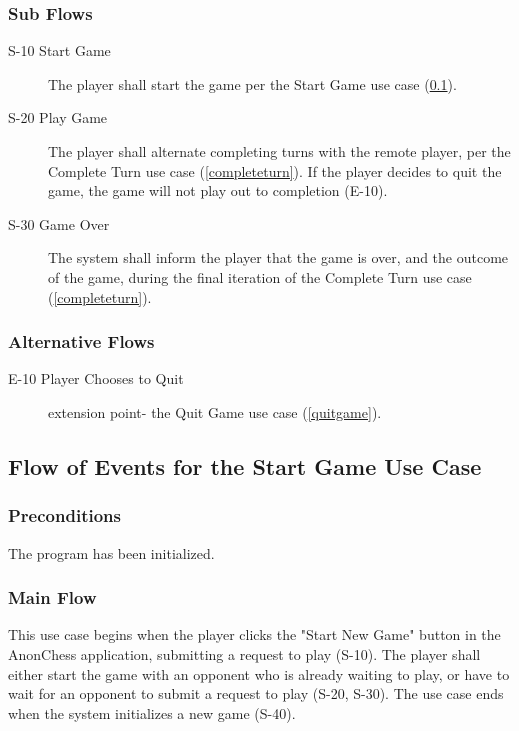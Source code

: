 \subsubsection{Sub Flows}
\begin{description}
\item[S-10 Start Game] The player shall start the game per the Start Game use case (\ref{startgame}). 
\item[S-20 Play Game] The player shall alternate completing turns with the remote player, per the Complete Turn use case (\ref{completeturn}). If the player decides to quit the game, the game will not play out to completion (E-10).
\item[S-30 Game Over] The system shall inform the player that the game is over, and the outcome of the game, during the final iteration of the Complete Turn use case (\ref{completeturn}).  
\end{description}
\subsubsection{Alternative Flows}
\begin{description}
\item[E-10 Player Chooses to Quit] extension point- the Quit Game use case  (\ref{quitgame}).
\end{description}

\subsection{Flow of Events for the Start Game Use Case }
\label{startgame}
\subsubsection{Preconditions}
 The program has been initialized.
\subsubsection{Main Flow}
 This use case begins when the player clicks the "Start New Game" button in the AnonChess application, submitting a request to play (S-10). The player shall either start the game with an opponent who is already waiting to play, or have to wait for an opponent to submit a request to play (S-20, S-30). The use case ends when the system initializes a new game (S-40).
